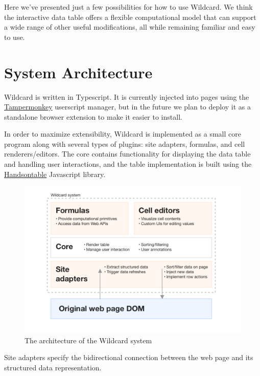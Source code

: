 \documentclass[english,submission]{programming}
\begin{document}
Here we've presented just a few possibilities for how to use Wildcard.
We think the interactive data table offers a flexible computational
model that can support a wide range of other useful modifications, all
while remaining familiar and easy to use.

\hypertarget{system-architecture}{%
\section{System Architecture}\label{system-architecture}}

Wildcard is written in Typescript. It is currently injected into pages
using the \href{https://www.tampermonkey.net/}{Tampermonkey} userscript
manager, but in the future we plan to deploy it as a standalone browser
extension to make it easier to install.

In order to maximize extensibility, Wildcard is implemented as a small
core program along with several types of plugins: site adapters,
formulas, and cell renderers/editors. The core contains functionality
for displaying the data table and handling user interactions, and the
table implementation is built using the
\href{https://handsontable.com/}{Handsontable} Javascript library.

\begin{figure}
\hypertarget{fig:architecture}{%
\centering
\includegraphics{media/architecture-clean.png}
\caption{The architecture of the Wildcard
system}\label{fig:architecture}
}
\end{figure}

Site adapters specify the bidirectional connection between the web page
and its structured data representation.
\end{document}
